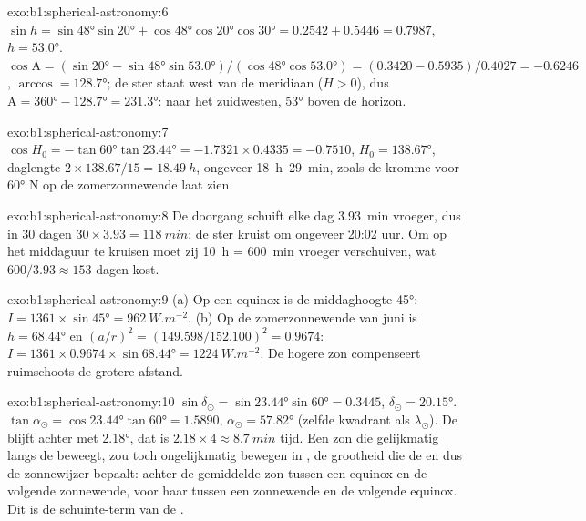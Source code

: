 \begin{solution}{exo:b1:spherical-astronomy:6}
$\sin h = \sin\ang{48}\sin\ang{20} + \cos\ang{48}\cos\ang{20}\cos\ang{30}
= 0.2542 + 0.5446 = 0.7987$, $h = \ang{53.0}$.
$\cos\mathrm{A} = (\sin\ang{20} - \sin\ang{48}\sin\ang{53.0})/(\cos\ang{48}
\cos\ang{53.0}) = (0.3420 - 0.5935)/0.4027 = -0.6246$, $\arccos = \ang{128.7}$;
de ster staat west van de meridiaan ($H > 0$), dus $\mathrm{A} = \ang{360} -
\ang{128.7} = \ang{231.3}$: naar het zuidwesten, \ang{53} boven de horizon.
\end{solution}

\begin{solution}{exo:b1:spherical-astronomy:7}
$\cos H_0 = -\tan\ang{60}\tan\ang{23.44} = -1.7321\times0.4335 = -0.7510$,
$H_0 = \ang{138.67}$, daglengte $2\times138.67/15 = \qty{18.49}{h}$, ongeveer
\qty{18}{h}~\qty{29}{min}, zoals de kromme voor \ang{60} N op de zomerzonnewende
laat zien.
\end{solution}

\begin{solution}{exo:b1:spherical-astronomy:8}
De doorgang schuift elke dag \qty{3.93}{min} vroeger, dus in 30 dagen
$30\times3.93 =
\qty{118}{min}$: de ster kruist om ongeveer 20:02 uur. Om op het
middaguur te kruisen moet zij \qty{10}{h} = \qty{600}{min} vroeger
verschuiven, wat $600/3.93 \approx 153$ dagen kost.
\end{solution}

\begin{solution}{exo:b1:spherical-astronomy:9}
(a) Op een equinox is de middaghoogte \ang{45}: $I = 1361\times\sin\ang{45}
= \qty{962}{W.m^{-2}}$. (b) Op de zomerzonnewende van juni is $h = \ang{68.44}$
en $(a/r)^2 = (149.598/152.100)^2 = 0.9674$:
$I = 1361\times0.9674\times\sin\ang{68.44} = \qty{1224}{W.m^{-2}}$. De hogere
zon compenseert ruimschoots de grotere afstand.
\end{solution}

\begin{solution}{exo:b1:spherical-astronomy:10}
$\sin\delta_\odot = \sin\ang{23.44}\sin\ang{60} = 0.3445$,
$\delta_\odot = \ang{20.15}$. $\tan\alpha_\odot = \cos\ang{23.44}\tan\ang{60}
= 1.5890$, $\alpha_\odot = \ang{57.82}$ (zelfde kwadrant als $\lambda_\odot$).
De  blijft achter met \ang{2.18}, dat is $2.18\times4 \approx
\qty{8.7}{min}$ tijd. Een zon die gelijkmatig langs de  beweegt, zou
toch ongelijkmatig bewegen in , de grootheid die de  en
dus de zonnewijzer bepaalt: achter de gemiddelde zon tussen een equinox en de
volgende zonnewende, voor haar tussen een zonnewende en de volgende equinox.
Dit is de schuinte-term van de .
\end{solution}

